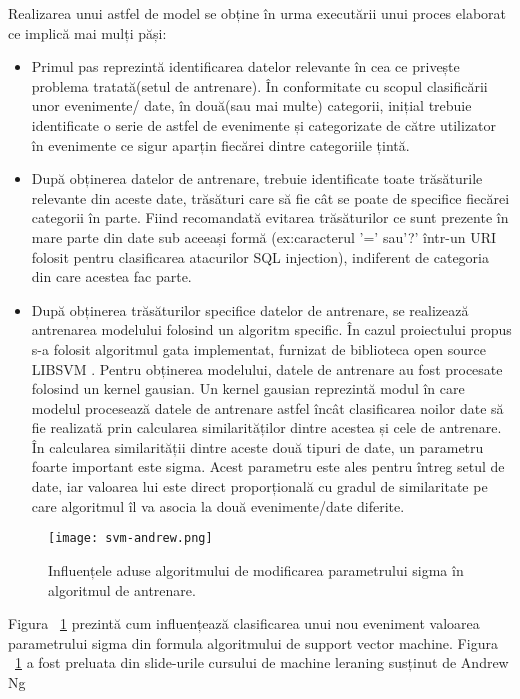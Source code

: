 Realizarea unui astfel de model se obține în urma executării unui proces elaborat ce implică mai mulți păși: 
\begin{itemize}
	\item  Primul pas reprezintă identificarea datelor relevante în cea ce privește problema tratată(setul de antrenare). În conformitate cu scopul clasificării unor evenimente/ date, în două(sau mai multe) categorii, inițial trebuie identificate o serie de astfel de evenimente și categorizate de către utilizator în evenimente ce sigur aparțin fiecărei dintre categoriile țintă. 
	\item  După  obținerea datelor de antrenare, trebuie identificate toate trăsăturile relevante din aceste date, trăsături care să fie cât se poate de specifice fiecărei categorii în parte. Fiind recomandată evitarea trăsăturilor ce sunt prezente în mare parte din date sub aceeași formă (ex:caracterul '=' sau'?' într-un URI folosit pentru clasificarea atacurilor SQL injection), indiferent de categoria din care acestea fac parte. 
	\item  După obținerea trăsăturilor specifice datelor de antrenare, se realizează antrenarea modelului folosind un algoritm specific. În cazul proiectului propus s-a folosit algoritmul gata implementat, furnizat de biblioteca open source LIBSVM  \cite{libsvm}.  Pentru obținerea modelului, datele de antrenare au fost procesate folosind un kernel gausian. Un kernel gausian reprezintă modul în care modelul procesează datele de antrenare astfel încât clasificarea noilor date să fie realizată prin calcularea similarităților dintre acestea și cele de antrenare. În calcularea similarității dintre aceste două tipuri de date, un parametru foarte important este sigma. Acest parametru este ales pentru întreg setul de date, iar valoarea lui este direct proporțională cu gradul de similaritate pe care algoritmul îl va asocia la două evenimente/date diferite. 
\end{itemize}



\begin{figure}[h]
	\centering
	\texttt{[image: svm-andrew.png]}
	\caption{ Influențele aduse algoritmului de modificarea parametrului sigma în algoritmul de antrenare. }
	\label{fig:rev-proxy}
\end{figure}


Figura ~\ref{fig:rev-proxy} prezintă cum influențează clasificarea unui nou eveniment valoarea parametrului sigma din formula algoritmului de support vector machine.  Figura ~\ref{fig:rev-proxy} a fost preluata din slide-urile cursului de machine leraning susținut de Andrew Ng \cite{andrew_ng} \\


